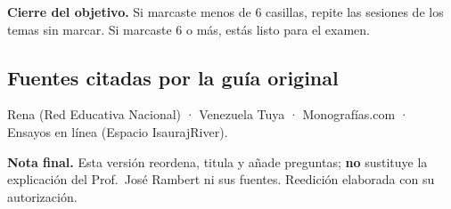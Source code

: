 \documentclass[12pt, letterpaper]{article}
\begin{document}
\begin{cuadroextra}
  \small
  \textbf{Cierre del objetivo.} Si marcaste menos de 6 casillas, repite las
  sesiones de los temas sin marcar. Si marcaste 6 o más, estás listo para el
  examen.
\end{cuadroextra}

\subsection*{Fuentes citadas por la guía original}
\noindent\small
Rena (Red Educativa Nacional) · Venezuela Tuya · Monografías.com · Ensayos en
línea (Espacio IsaurajRiver).

\vspace{6pt}
\begin{cuadroinfo}
  \footnotesize
  \textbf{Nota final.} Esta versión reordena, titula y añade preguntas;
  \textbf{no} sustituye la explicación del Prof.\ José Rambert ni sus fuentes.
  Reedición elaborada con su autorización.
\end{cuadroinfo}
\end{document}
